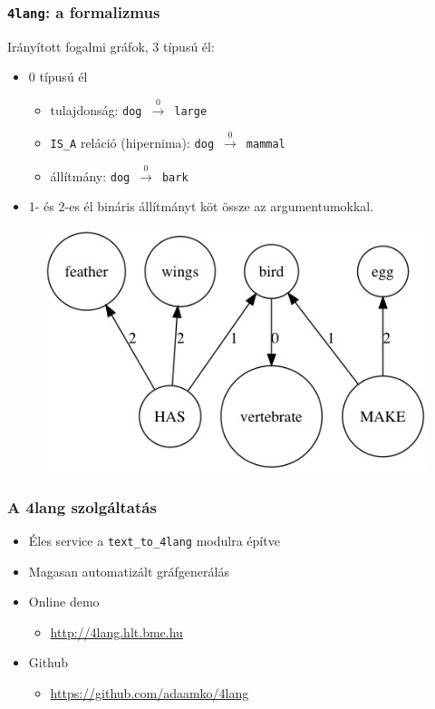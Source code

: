 \documentclass[bigger]{beamer}
\newcommand{\tefl}{\texttt{text\_to\_4lang}\xspace}
\newcommand{\fl}{\texttt{4lang}\xspace}
\begin{document}
{

\begin{frame}
    \frametitle{\fl: a formalizmus \citep{Kornai:2010,Kornai:2015a}}
\pause Irányított fogalmi gráfok, 3 típusú él:
\begin{itemize}
    \pause \item 0 típusú él
        \begin{itemize}
            \pause \item tulajdonság: \texttt{dog}~$\xrightarrow0$~\texttt{large}
            \pause \item \texttt{IS\_A} reláció (hipernima): \texttt{dog}~$\xrightarrow0$~\texttt{mammal}
            \pause \item állítmány: \texttt{dog}~$\xrightarrow0$~\texttt{bark}
        \end{itemize}
    \pause \item 1- és 2-es él bináris állítmányt köt össze az argumentumokkal.
\end{itemize}
\pause \begin{figure}
\centering
    \includegraphics[scale=0.4]{pics/bird.jpg}
\end{figure}
\end{frame}
}
\begin{frame}
\frametitle{A 4lang szolgáltatás}
		\begin{itemize}
			\pause \item Éles service a \tefl modulra építve
			\pause \item Magasan automatizált gráfgenerálás
			\pause \item Online demo
			\begin{itemize}
				 \item \url{http://4lang.hlt.bme.hu}
			\end{itemize}
			\pause \item Github
			\begin{itemize}
				\item \url{https://github.com/adaamko/4lang}
			\end{itemize}
		\end{itemize}

\end{frame}
\end{document}

